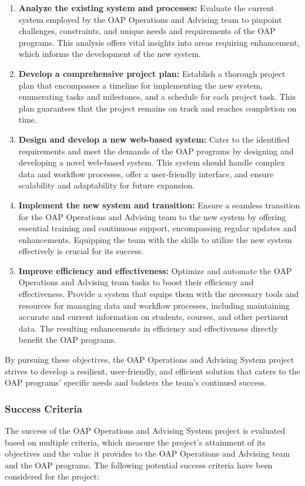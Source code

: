 \documentclass[12pt]{article}
\begin{document}
\begin{enumerate}[label=(\roman*)]
    \item \textbf{Analyze the existing system and processes:} Evaluate the current system employed by the OAP Operations and Advising team to pinpoint challenges, constraints, and unique needs and requirements of the OAP programs. This analysis offers vital insights into areas requiring enhancement, which informs the development of the new system.
    \item \textbf{Develop a comprehensive project plan:} Establish a thorough project plan that encompasses a timeline for implementing the new system, enumerating tasks and milestones, and a schedule for each project task. This plan guarantees that the project remains on track and reaches completion on time.
    \item \textbf{Design and develop a new web-based system:} Cater to the identified requirements and meet the demands of the OAP programs by designing and developing a novel web-based system. This system should handle complex data and workflow processes, offer a user-friendly interface, and ensure scalability and adaptability for future expansion.
    \item \textbf{Implement the new system and transition:} Ensure a seamless transition for the OAP Operations and Advising team to the new system by offering essential training and continuous support, encompassing regular updates and enhancements. Equipping the team with the skills to utilize the new system effectively is crucial for its success.
    \item \textbf{Improve efficiency and effectiveness:} Optimize and automate the OAP Operations and Advising team tasks to boost their efficiency and effectiveness. Provide a system that equips them with the necessary tools and resources for managing data and workflow processes, including maintaining accurate and current information on students, courses, and other pertinent data. The resulting enhancements in efficiency and effectiveness directly benefit the OAP programs.
\end{enumerate}

By pursuing these objectives, the OAP Operations and Advising System project strives to develop a resilient, user-friendly, and efficient solution that caters to the OAP programs' specific needs and bolsters the team's continued success.

\subsubsection{Success Criteria} 
The success of the OAP Operations and Advising System project is evaluated based on multiple criteria, which measure the project's attainment of its objectives and the value it provides to the OAP Operations and Advising team and the OAP programs. The following potential success criteria have been considered for the project:
\end{document}

